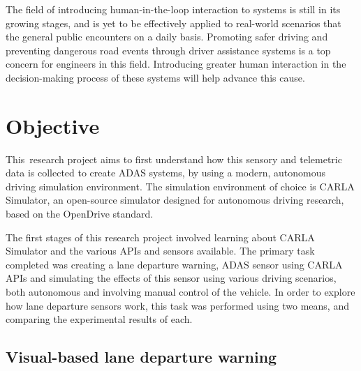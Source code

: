 \documentclass[12pt]{article}
\renewcommand{\_}{\kern-1.5pt\textunderscore\kern-1.5pt}
\begin{document}
\vspace{\baselineskip}
The field of introducing human-in-the-loop interaction to systems is still in its growing stages, and is yet to be effectively applied to real-world scenarios that the general public encounters on a daily basis. Promoting safer driving and preventing dangerous road events through driver assistance systems is a top concern for engineers in this field. Introducing greater human interaction in the decision-making process of these systems will help advance this cause.\par

\section{Objective}
This\ research project aims to first understand how this sensory and telemetric data is collected to create ADAS systems, by using a modern, autonomous driving simulation environment. The simulation environment of choice is CARLA Simulator, an open-source simulator designed for autonomous driving research, based on the OpenDrive standard. \par %


\vspace{\baselineskip}
The first stages of this research project involved learning about CARLA Simulator and the various APIs and sensors available. The primary task completed was creating a lane departure warning, ADAS sensor using CARLA APIs and simulating the effects of this sensor using various driving scenarios, both autonomous and involving manual control of the vehicle. In order to explore how lane departure sensors work, this task was performed using two means, and comparing the experimental results of each.\par


\subsection{Visual-based lane departure warning}
\end{document}
